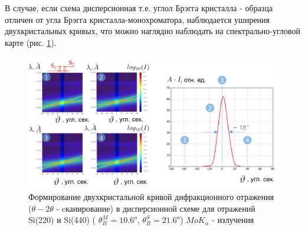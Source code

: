 В случае, если схема дисперсионная т.е. углол Брэгга кристалла - образца отличен от угла Брэгга кристалла-монохроматора,
наблюдается уширения двухкристальных кривых, что можно наглядно наблюдать
на спектрально-угловой карте (рис. \ref{ris:double_crystal_form_kdo_dissp}).
 \begin{figure}[H]
   \centering
   \includegraphics[width=1\textwidth]{images/double_crystal_form_kdo_dissp.png}
   \caption{Формирование двухкристальной кривой дифракционного отражения
   ($\theta - 2\theta$ - cканирование) в дисперсионной схеме для отражений Si(220) и Si(440)
   ( $\theta_B^M = 10.6^o$, $\theta_B^S = 21.6^o$)  $MoK_{\alpha}$ - излучения}
   \label{ris:double_crystal_form_kdo_dissp}
 \end{figure}
